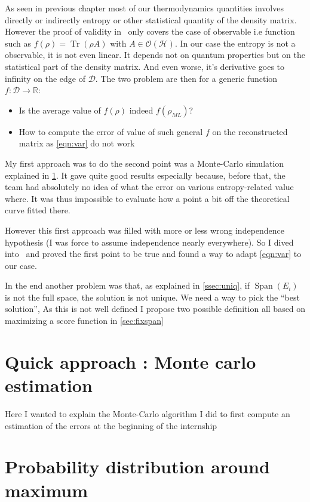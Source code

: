 \documentclass[10pt]{report}
\theoremstyle{plain}
\theoremstyle{definition}
\theoremstyle{remark}
\newcommand{\R}{\ensuremath{\mathbb{R}}}
\DeclareMathOperator{\Tr}{Tr}
\DeclareMathOperator{\Span}{Span}
\newcommand{\ml}{_{M\!L}}
\begin{document}
As seen in previous chapter most of our thermodynamics quantities involves
directly or indirectly entropy or other statistical quantity of the density
matrix. However the proof of validity in~\cite{SPRAL17} only covers the case of
observable i.e function such as $f(\rho) = \Tr(\rho A)$ with $A \in
\mathcal{O}(\mathcal{H})$. In our case the entropy is not a observable, it is not even
linear. It depends not on quantum properties but on the statistical part of the
density matrix. And even worse, it's derivative goes to infinity on the edge of
$\mathcal{D}$. The two problem are then for a generic function $f : \mathcal{D}
\to \R$:
\begin{itemize}
\item Is the average value of $f(\rho)$ indeed $f(\rho\ml)$?
\item How to compute the error of value of such general $f$ on the reconstructed
  matrix as \cref{eqn:var} do not work
\end{itemize}

My first approach was to do the second point was a Monte-Carlo simulation
explained in \cref{sec:MC}. It gave quite good results especially because,
before that, the team had absolutely no idea of what the error on various
entropy-related value where. It was thus impossible to evaluate how a point a
bit off the theoretical curve fitted there.

However this first approach was filled with more or less wrong independence
hypothesis (I was force to assume independence nearly everywhere). So I dived
into~\cite{SPRAL17} and proved the first point to be true and found a way to
adapt \cref{eqn:var} to our case.

In the end another problem was that, as explained in \cref{ssec:uniq}, if
$\Span(E_i)$ is not the full space, the solution is not unique. We need a way to
pick the ``best solution'', As this is not well defined I propose two possible
definition all based on maximizing a score function in \cref{sec:fixspan}

\section{Quick approach : Monte carlo estimation}\label{sec:MC}

Here I wanted to explain the Monte-Carlo algorithm I did to first compute an
estimation of the errors at the beginning of the internship

\section{Probability distribution around maximum}
\end{document}
